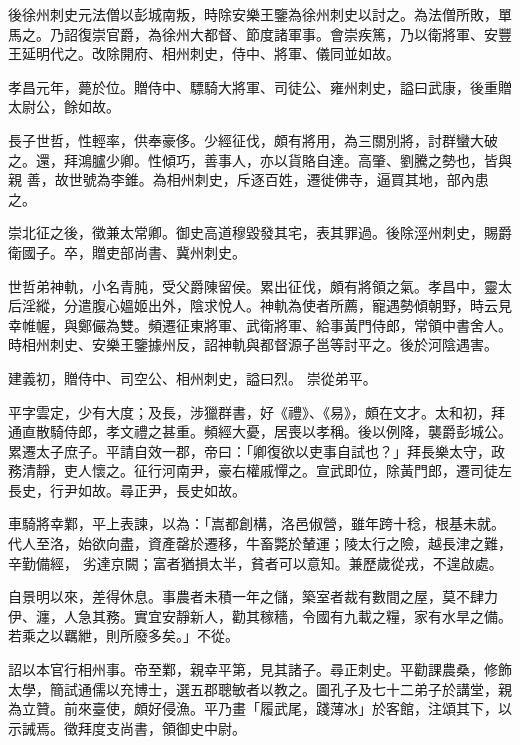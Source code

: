 \begin{pinyinscope}
 後徐州刺史元法僧以彭城南叛，時除安樂王鑒為徐州刺史以討之。為法僧所敗，單馬之。乃詔復崇官爵，為徐州大都督、節度諸軍事。會崇疾篤，乃以衛將軍、安豐王延明代之。改除開府、相州刺史，侍中、將軍、儀同並如故。



 孝昌元年，薨於位。贈侍中、驃騎大將軍、司徒公、雍州刺史，謚曰武康，後重贈太尉公，餘如故。



 長子世哲，性輕率，供奉豪侈。少經征伐，頗有將用，為三關別將，討群蠻大破之。還，拜鴻臚少卿。性傾巧，善事人，亦以貨賂自達。高肇、劉騰之勢也，皆與親
 善，故世號為李錐。為相州刺史，斥逐百姓，遷徙佛寺，逼買其地，部內患之。



 崇北征之後，徵兼太常卿。御史高道穆毀發其宅，表其罪過。後除涇州刺史，賜爵衛國子。卒，贈吏部尚書、冀州刺史。



 世哲弟神軌，小名青肫，受父爵陳留侯。累出征伐，頗有將領之氣。孝昌中，靈太后淫縱，分遣腹心媼姬出外，陰求悅人。神軌為使者所薦，寵遇勢傾朝野，時云見幸帷幄，與鄭儼為雙。頻遷征東將軍、武衛將軍、給事黃門侍郎，常領中書舍人。時相州刺史、安樂王鑒據州反，詔神軌與都督源子邕等討平之。後於河陰遇害。



 建義初，贈侍中、司空公、相州刺史，謚曰烈。
 崇從弟平。



 平字雲定，少有大度；及長，涉獵群書，好《禮》、《易》，頗在文才。太和初，拜通直散騎侍郎，孝文禮之甚重。頻經大憂，居喪以孝稱。後以例降，襲爵彭城公。累遷太子庶子。平請自效一郡，帝曰：「卿復欲以吏事自試也？」拜長樂太守，政務清靜，吏人懷之。征行河南尹，豪右權戚憚之。宣武即位，除黃門郎，遷司徒左長史，行尹如故。尋正尹，長史如故。



 車騎將幸鄴，平上表諫，以為：「嵩都創構，洛邑俶營，雖年跨十稔，根基未就。代人至洛，始欲向盡，資產罄於遷移，牛畜斃於輦運；陵太行之險，越長津之難，辛勤備經，
 劣達京闕；富者猶損太半，貧者可以意知。兼歷歲從戎，不遑啟處。



 自景明以來，差得休息。事農者未積一年之儲，築室者裁有數間之屋，莫不肆力伊、瀍，人急其務。實宜安靜新人，勸其稼穡，令國有九載之糧，家有水旱之備。若乘之以羈紲，則所廢多矣。」不從。



 詔以本官行相州事。帝至鄴，親幸平第，見其諸子。尋正刺史。平勸課農桑，修飾太學，簡試通儒以充博士，選五郡聰敏者以教之。圖孔子及七十二弟子於講堂，親為立贊。前來臺使，頗好侵漁。平乃畫「履武尾，踐薄冰」於客館，注頌其下，以示誡焉。徵拜度支尚書，領御史中尉。




\end{pinyinscope}

